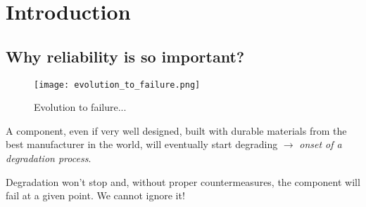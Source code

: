 
\chapter{Introduction}
\section{Why reliability is so important?}

\begin{figure}[!htp]
    \centering
    \texttt{[image: evolution\_to\_failure.png]}
    \caption{Evolution to failure...}
\end{figure}

A component, even if very well designed, built with durable materials from the
best manufacturer in the world, will eventually start degrading $\to$
\emph{onset of a degradation process}.

Degradation won't stop and, without proper countermeasures, the component will
fail at a given point. We cannot ignore it!